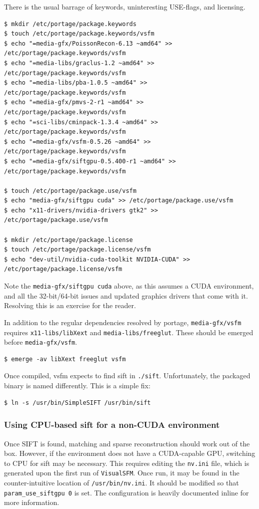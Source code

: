 There is the usual barrage of keywords, uninteresting USE-flags, and licensing.

\begin{lstlisting}
$ mkdir /etc/portage/package.keywords
$ touch /etc/portage/package.keywords/vsfm
$ echo "=media-gfx/PoissonRecon-6.13 ~amd64" >> /etc/portage/package.keywords/vsfm
$ echo "=media-libs/graclus-1.2 ~amd64" >> /etc/portage/package.keywords/vsfm
$ echo "=media-libs/pba-1.0.5 ~amd64" >> /etc/portage/package.keywords/vsfm
$ echo "=media-gfx/pmvs-2-r1 ~amd64" >> /etc/portage/package.keywords/vsfm
$ echo "=sci-libs/cminpack-1.3.4 ~amd64" >> /etc/portage/package.keywords/vsfm
$ echo "=media-gfx/vsfm-0.5.26 ~amd64" >> /etc/portage/package.keywords/vsfm
$ echo "=media-gfx/siftgpu-0.5.400-r1 ~amd64" >> /etc/portage/package.keywords/vsfm

$ touch /etc/portage/package.use/vsfm
$ echo "media-gfx/siftgpu cuda" >> /etc/portage/package.use/vsfm
$ echo "x11-drivers/nvidia-drivers gtk2" >> /etc/portage/package.use/vsfm

$ mkdir /etc/portage/package.license
$ touch /etc/portage/package.license/vsfm
$ echo "dev-util/nvidia-cuda-toolkit NVIDIA-CUDA" >> /etc/portage/package.license/vsfm
\end{lstlisting}

Note the {\tt media-gfx/siftgpu cuda} above, as this assumes a CUDA environment, and all the 32-bit/64-bit issues and updated graphics drivers that come with it. Resolving this is an exercise for the reader.

In addition to the regular dependencies resolved by portage, {\tt media-gfx/vsfm} requires {\tt x11-libs/libXext} and {\tt media-libs/freeglut}. These should be emerged before {\tt media-gfx/vsfm}.

\begin{lstlisting}
$ emerge -av libXext freeglut vsfm
\end{lstlisting}

Once compiled, vsfm expects to find sift in {\tt ./sift}. Unfortunately, the packaged binary is named differently. This is a simple fix:
\begin{lstlisting}
$ ln -s /usr/bin/SimpleSIFT /usr/bin/sift
\end{lstlisting}

\subsubsection{Using CPU-based sift for a non-CUDA environment}
Once SIFT is found, matching and sparse reconstruction should work out of the box. However, if the environment does not have a CUDA-capable GPU, switching to CPU for sift may be necessary. This requires editing the {\tt nv.ini} file, which is generated upon the first run of {\tt VisualSFM}. Once run, it may be found in the counter-intuitive location of {\tt /usr/bin/nv.ini}. It should be modified so that {\tt param\_use\_siftgpu 0} is set. The configuration is heavily documented inline for more information.

